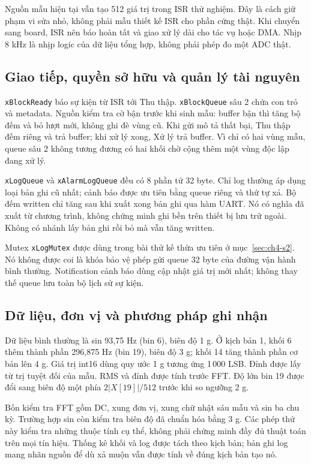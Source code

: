 \documentclass[12pt,a4paper,oneside]{report}
\begin{document}
Nguồn mẫu hiện tại vẫn tạo 512 giá trị trong ISR thử nghiệm. Đây là cách giữ phạm vi sửa nhỏ, không phải mẫu thiết kế ISR cho phần cứng thật. Khi chuyển sang board, ISR nên báo hoàn tất và giao xử lý dài cho tác vụ hoặc DMA. Nhịp 8 kHz là nhịp logic của dữ liệu tổng hợp, không phải phép đo một ADC thật.

\subsection{Giao tiếp, quyền sở hữu và quản lý tài nguyên}
\texttt{xBlockReady} báo sự kiện từ ISR tới Thu thập. \texttt{xBlockQueue} sâu 2 chứa con trỏ và metadata. Nguồn kiểm tra cờ bận trước khi sinh mẫu: buffer bận thì tăng bộ đếm và bỏ lượt mới, không ghi đè vùng cũ. Khi gửi mô tả thất bại, Thu thập đếm riêng và trả buffer; khi xử lý xong, Xử lý trả buffer. Vì chỉ có hai vùng mẫu, queue sâu 2 không tương đương có hai khối chờ cộng thêm một vùng độc lập đang xử lý.

\texttt{xLogQueue} và \texttt{xAlarmLogQueue} đều có 8 phần tử 32 byte. Chỉ log thường áp dụng loại bản ghi cũ nhất; cảnh báo được ưu tiên bằng queue riêng và thứ tự xả. Bộ đếm written chỉ tăng sau khi xuất xong bản ghi qua hàm UART. Nó có nghĩa đã xuất từ chương trình, không chứng minh ghi bền trên thiết bị lưu trữ ngoài. Không có nhánh lấy bản ghi rồi bỏ mà vẫn tăng written.

Mutex \texttt{xLogMutex} được dùng trong bài thử kế thừa ưu tiên ở mục~\ref{sec:ch4-s2}. Nó không được coi là khóa bảo vệ phép gửi queue 32 byte của đường vận hành bình thường. Notification cảnh báo dùng cập nhật giá trị mới nhất; không thay thế queue lưu toàn bộ lịch sử sự kiện.

\subsection{Dữ liệu, đơn vị và phương pháp ghi nhận}
Dữ liệu bình thường là sin 93,75 Hz (bin 6), biên độ 1 g. Ở kịch bản 1, khối 6 thêm thành phần 296,875 Hz (bin 19), biên độ 3 g; khối 14 tăng thành phần cơ bản lên 4 g. Giá trị int16 dùng quy ước 1 g tương ứng 1\,000 LSB. Đỉnh được lấy từ trị tuyệt đối của mẫu. RMS và đỉnh được tính trước FFT. Độ lớn bin 19 được đổi sang biên độ một phía $2|X[19]|/512$ trước khi so ngưỡng 2 g.

Bốn kiểm tra FFT gồm DC, xung đơn vị, xung chữ nhật sáu mẫu và sin ba chu kỳ. Trường hợp sin còn kiểm tra biên độ đã chuẩn hóa bằng 3 g. Các phép thử này kiểm tra những thuộc tính cụ thể, không phải chứng minh đầy đủ thuật toán trên mọi tín hiệu. Thống kê khối và log được tách theo kịch bản; bản ghi log mang nhãn nguồn để dù xả muộn vẫn được tính về đúng kịch bản tạo nó.
\end{document}
